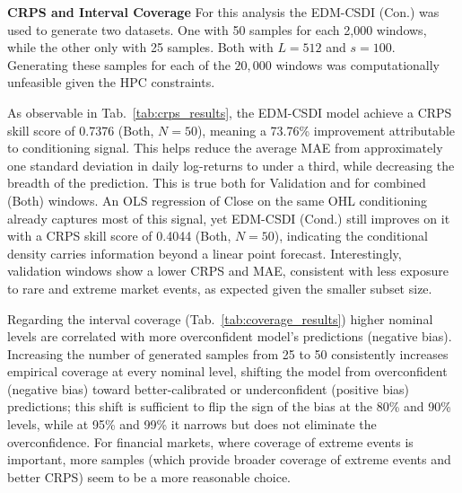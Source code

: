 \textbf{CRPS and Interval Coverage} \quad For this analysis the EDM-CSDI (Con.) was used to generate two datasets. One with 50 samples for each 2,000 windows, while the other only with 25 samples. Both with \(L=512\) and \(s=100\). Generating these samples for each of the \(20,000\) windows was computationally unfeasible given the HPC constraints.

As observable in Tab.\ \ref{tab:crps_results}, the EDM-CSDI model achieve a CRPS skill score of 0.7376 (Both, \(N=50\)), meaning a 73.76\% improvement attributable to conditioning signal. This helps reduce the average MAE from approximately one standard deviation in daily log-returns to under a third, while decreasing the breadth of the prediction. This is true both for Validation and for combined (Both) windows. An OLS regression of Close on the same OHL conditioning already captures most of this signal, yet EDM-CSDI (Cond.) still improves on it with a CRPS skill score of 0.4044 (Both, $N=50$), indicating the conditional density carries information beyond a linear point forecast. Interestingly, validation windows show a lower CRPS and MAE, consistent with less exposure to rare and extreme market events, as expected given the smaller subset size.

Regarding the interval coverage (Tab.\ \ref{tab:coverage_results}) higher nominal levels are correlated with more overconfident model's predictions (negative bias). Increasing the number of generated samples from 25 to 50 consistently increases empirical coverage at every nominal level, shifting the model from overconfident (negative bias) toward better-calibrated or underconfident (positive bias) predictions; this shift is sufficient to flip the sign of the bias at the 80\% and 90\% levels, while at 95\% and 99\% it narrows but does not eliminate the overconfidence. For financial markets, where coverage of extreme events is important, more samples (which provide broader coverage of extreme events and better CRPS) seem to be a more reasonable choice.

